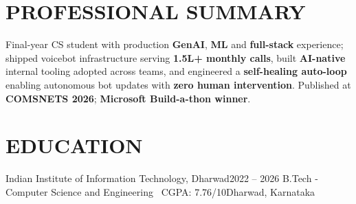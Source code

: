 


\vspace{-8pt}

\section{\textbf{PROFESSIONAL SUMMARY}}
\vspace{-1pt}
\begin{itemize}[leftmargin=0.15in, label={}]
\small{\item{
Final-year CS student with production \textbf{GenAI}, \textbf{ML} and \textbf{full-stack} experience; shipped voicebot infrastructure serving \textbf{1.5L+ monthly calls}, built \textbf{AI-native} internal tooling adopted across teams, and engineered a \textbf{self-healing auto-loop} enabling autonomous bot updates with \textbf{zero human intervention}. Published at \textbf{COMSNETS 2026}; \textbf{Microsoft Build-a-thon winner}.
}}
\end{itemize}

\vspace{-12pt}
\section{\textbf{EDUCATION}}
  \resumeSubHeadingListStart
    \resumeSubheading
      {Indian Institute of Information Technology, Dharwad}{2022 -- 2026}
      {B.Tech - Computer Science and Engineering \textbar\ \textnormal{CGPA: 7.76/10}}{Dharwad, Karnataka}
  \resumeSubHeadingListEnd


